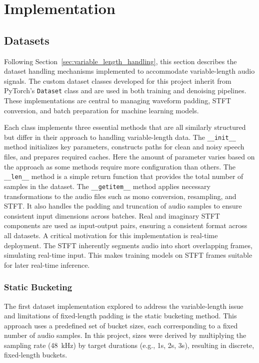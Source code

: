 \graphicspath{{content/chapters/6_implementation/figures/}}
\chapter{Implementation}
\label{chp:implementation}

\section{Datasets}
\label{sec:datasets}

Following Section~\ref{sec:variable_length_handling}, this section describes the dataset handling mechanisms implemented to accommodate variable-length audio signals. The custom dataset classes developed for this project inherit from PyTorch’s \texttt{Dataset} class and are used in both training and denoising pipelines. These implementations are central to managing waveform padding, STFT conversion, and batch preparation for machine learning models.

Each class implements three essential methods that are all similarly structured but differ in their approach to handling variable-length data. The \texttt{\_\_init\_\_} method initializes key parameters, constructs paths for clean and noisy speech files, and prepares required caches. Here the amount of parameter varies based on the approach as some methods require more configuration than others. The \texttt{\_\_len\_\_} method is a simple return function that provides the total number of samples in the dataset. The \texttt{\_\_getitem\_\_} method applies necessary transformations to the audio files such as mono conversion, resampling, and STFT. It also handles the padding and truncation of audio samples to ensure consistent input dimensions across batches. Real and imaginary STFT components are used as input-output pairs, ensuring a consistent format across all datasets. A critical motivation for this implementation is real-time deployment. The STFT inherently segments audio into short overlapping frames, simulating real-time input. This makes training models on STFT frames suitable for later real-time inference.

\subsection{Static Bucketing}
\label{subsec:static_dataset}

The first dataset implementation explored to address the variable-length issue and limitations of fixed-length padding is the static bucketing method. This approach uses a predefined set of bucket sizes, each corresponding to a fixed number of audio samples. In this project, sizes were derived by multiplying the sampling rate (48~kHz) by target durations (e.g., 1s, 2s, 3s), resulting in discrete, fixed-length buckets.

